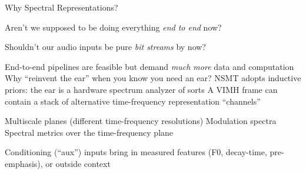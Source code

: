 \begin{slide}[\slideopts,toc={Spectra}]{Why Spectral Representations?}

  Aren't we supposed to be doing everything \emph{end to end} now?

  \maybepause

  Shouldn't our audio inputs be pure \emph{bit streams} by now?

  \begin{itemize}
    \mpitem End-to-end pipelines are feasible but demand \emph{much more} data and computation
    \mpitem Why ``reinvent the ear'' when you know you need an ear?
    \mpitem NSMT adopts inductive priors: the ear is a hardware spectrum analyzer of sorts
    \mpitem A VIMH frame can contain a stack of alternative time-frequency representation ``channels''
    \begin{itemize}
      \mpitem Multiscale planes (different time-frequency resolutions)
      \mpitem Modulation spectra
      \mpitem Spectral metrics over the time-frequency plane
    \end{itemize}
    \mpitem Conditioning (``aux'') inputs bring in measured features (F0, decay-time, pre-emphasis), or outside context
  \end{itemize}
\end{slide}

